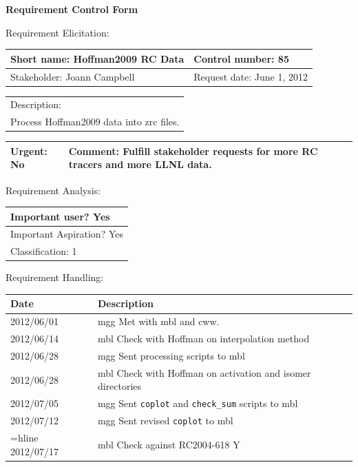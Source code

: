 \begin{center}\Large\bf
Requirement Control Form
\end{center}
\vspace{24pt}

Requirement Elicitation:

\begin{tabular}{|p{211pt}|p{211pt}|} \hline
Short name: Hoffman2009 RC Data & Control number: 85\\ \hline
Stakeholder: Joann Campbell & Request date: June 1, 2012\\
\end{tabular}
\begin{tabular}{|p{433pt}|} \hline
Description: \\ 
Process Hoffman2009 data into zrc files.\\ 
\hline
\end{tabular} 
\begin{tabular}{|p{211pt}|p{211pt}|} \hline
Urgent: No & Comment: Fulfill stakeholder requests for more RC tracers
and more LLNL data. \\ \hline
\end{tabular}

\vspace{24pt}

Requirement Analysis:

\begin{tabular}{|p{433pt}|} \hline
Important user? Yes \\ \hline
Important Aspiration? Yes \\ \hline
Classification: 1 \\ \hline
\end{tabular}

\vspace{24pt}

Requirement Handling:

\begin{tabular}{|p{72pt}|p{351pt}|} \hline
Date & Description \\ \hline
2012/06/01 & mgg Met with mbl and cww. \\ \hline 
2012/06/14 & mbl Check with Hoffman on interpolation method \\ \hline 
2012/06/28 & mgg Sent processing scripts to mbl \\ \hline
2012/06/28 & mbl Check with Hoffman on activation and isomer
directories \\ \hline
2012/07/05 & mgg Sent \texttt{coplot} and \texttt{check\_sum} scripts
to mbl \\ \hline 
2012/07/12 & mgg Sent revised \texttt{coplot} to mbl \\ =hline
2012/07/17 & mbl Check against RC2004-618 Y \\ \hline
\end{tabular}

